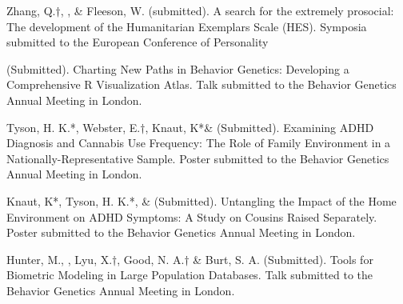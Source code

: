 

\item Zhang, Q.$\dagger$, \meb, \&  Fleeson, W. (submitted). A search for the extremely prosocial: The development of the Humanitarian Exemplars Scale (HES). Symposia submitted to the European Conference of Personality %

\item \meb (Submitted). Charting New Paths in Behavior Genetics: Developing a Comprehensive R Visualization Atlas. Talk submitted to the Behavior Genetics Annual Meeting in London.

\item Tyson, H. K.*, Webster, E.$\dagger$, Knaut, K*\& \meb (Submitted). Examining ADHD Diagnosis and Cannabis Use Frequency: The Role of Family Environment in a Nationally-Representative Sample. Poster submitted to the Behavior Genetics Annual Meeting in London.

\item Knaut, K*, Tyson, H. K.*, \& \meb (Submitted). Untangling the Impact of the Home Environment on ADHD Symptoms: A Study on Cousins Raised Separately. Poster submitted to the Behavior Genetics Annual Meeting in London.

\item Hunter, M., \meb, Lyu, X.$\dagger$, Good, N. A.$\dagger$ \& Burt, S. A. (Submitted). Tools for Biometric Modeling in Large Population Databases. Talk submitted to the Behavior Genetics Annual Meeting in London.
%

%

%
